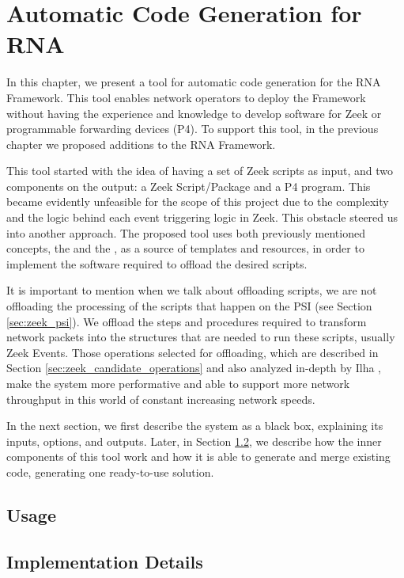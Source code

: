 \chapter{Automatic Code Generation for RNA}
\label{cap:code_gen}


In this chapter, we present a tool for automatic code generation for the RNA Framework. This tool enables network operators to deploy the Framework without having the experience and knowledge to develop software for Zeek or programmable forwarding devices (P4). To support this tool, in the previous chapter we proposed additions to the RNA Framework. 


This tool started with the idea of having a set of Zeek scripts as input, and two components on the output: a Zeek Script/Package and a P4 program. This became evidently unfeasible for the scope of this project due to the complexity and the logic behind each event triggering logic in Zeek. This obstacle steered us into another approach. The proposed tool uses both previously mentioned concepts, the \ProtocolTemplates{} and the \Offloaders{}, as a source of templates and resources, in order to implement the software required to offload the desired scripts. 

It is important to mention when we talk about offloading scripts, we are not offloading the processing of the scripts that happen on the PSI (see Section \ref{sec:zeek_psi}). We offload the steps and procedures required to transform network packets into the structures that are needed to run these scripts, usually Zeek Events. Those operations selected for offloading, which are described in Section \ref{sec:zeek_candidate_operations} and also analyzed in-depth by Ilha \cite{Ilha2022}, make the system more performative and able to support more network throughput in this world of constant increasing network speeds.

In the next section, we first describe the system as a black box, explaining its inputs, options, and outputs. Later, in Section \ref{sec:code_gen_impl}, we describe how the inner components of this tool work and how it is able to generate and merge existing code, generating one ready-to-use solution.

\section{Usage}




\section{Implementation Details}
\label{sec:code_gen_impl}


